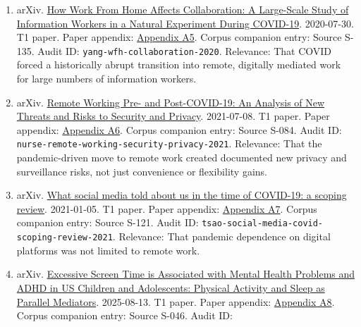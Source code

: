 \documentclass[
  american,
  11pt,
  letterpaper,
]{article}
\begin{document}
\begin{enumerate}
{  A4}. Corpus companion entry: Source S-114. Audit ID:
  \texttt{smite-wfh-here-to-stay-2022}. Relevance: That pandemic-era
  remote work was not only temporary improvisation; it reshaped
  post-pandemic organizational policy and worker expectations.
\item
  arXiv. \href{https://arxiv.org/abs/2007.15584}{How Work From Home
  Affects Collaboration: A Large-Scale Study of Information Workers in a
  Natural Experiment During COVID-19}. 2020-07-30. T1 paper. Paper
  appendix:
  \hyperref[ch-03-appendix-a5-how-work-from-home-affects-collaboration-a-large-scale-study-of-information-workers-in-a-natural-experiment-during-covid-19]{Appendix
  A5}. Corpus companion entry: Source S-135. Audit ID:
  \texttt{yang-wfh-collaboration-2020}. Relevance: That COVID forced a
  historically abrupt transition into remote, digitally mediated work
  for large numbers of information workers.
\item
  arXiv. \href{https://arxiv.org/abs/2107.03907}{Remote Working Pre- and
  Post-COVID-19: An Analysis of New Threats and Risks to Security and
  Privacy}. 2021-07-08. T1 paper. Paper appendix:
  \hyperref[ch-03-appendix-a6-remote-working-pre-and-post-covid-19-an-analysis-of-new-threats-and-risks-to-security-and-privacy]{Appendix
  A6}. Corpus companion entry: Source S-084. Audit ID:
  \texttt{nurse-remote-working-security-privacy-2021}. Relevance: That
  the pandemic-driven move to remote work created documented new privacy
  and surveillance risks, not just convenience or flexibility gains.
\item
  arXiv. \href{https://arxiv.org/abs/2101.01688}{What social media told
  about us in the time of COVID-19: a scoping review}. 2021-01-05. T1
  paper. Paper appendix:
  \hyperref[ch-03-appendix-a7-what-social-media-told-about-us-in-the-time-of-covid-19-a-scoping-review]{Appendix
  A7}. Corpus companion entry: Source S-121. Audit ID:
  \texttt{tsao-social-media-covid-scoping-review-2021}. Relevance: That
  pandemic dependence on digital platforms was not limited to remote
  work.
\item
  arXiv. \href{https://arxiv.org/abs/2508.10062}{Excessive Screen Time
  is Associated with Mental Health Problems and ADHD in US Children and
  Adolescents: Physical Activity and Sleep as Parallel Mediators}.
  2025-08-13. T1 paper. Paper appendix:
  \hyperref[ch-03-appendix-a8-excessive-screen-time-is-associated-with-mental-health-problems-and-adhd-in-us-children-and-adolescents-physical-activity-and-sleep-as-parallel-mediators]{Appendix
  A8}. Corpus companion entry: Source S-046. Audit ID:

\end{enumerate}
\end{document}
